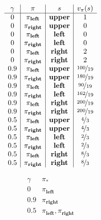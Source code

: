 \begin{solution}
\begin{align*}
    \begin{array}{c|c|c|c}
        \gamma & \pi                & s              & v_\pi(s)           \\ \hline
        0      & \pi_\textbf{left}  & \textbf{upper} & 1                  \\
        0      & \pi_\textbf{right} & \textbf{upper} & 0                  \\
        0      & \pi_\textbf{left}  & \textbf{left}  & 0                  \\
        0      & \pi_\textbf{right} & \textbf{left}  & 0                  \\
        0      & \pi_\textbf{left}  & \textbf{right} & 2                  \\
        0      & \pi_\textbf{right} & \textbf{right} & 2                  \\
        0.9    & \pi_\textbf{left}  & \textbf{upper} & \nicefrac{100}{19} \\
        0.9    & \pi_\textbf{right} & \textbf{upper} & \nicefrac{180}{19} \\
        0.9    & \pi_\textbf{left}  & \textbf{left}  & \nicefrac{90} {19} \\
        0.9    & \pi_\textbf{right} & \textbf{left}  & \nicefrac{162}{19} \\
        0.9    & \pi_\textbf{left}  & \textbf{right} & \nicefrac{200}{19} \\
        0.9    & \pi_\textbf{right} & \textbf{right} & \nicefrac{200}{19} \\
        0.5    & \pi_\textbf{left}  & \textbf{upper} & \nicefrac{4}{3}    \\
        0.5    & \pi_\textbf{right} & \textbf{upper} & \nicefrac{4}{3}    \\
        0.5    & \pi_\textbf{left}  & \textbf{left}  & \nicefrac{2}{3}    \\
        0.5    & \pi_\textbf{right} & \textbf{left}  & \nicefrac{2}{3}    \\
        0.5    & \pi_\textbf{left}  & \textbf{right} & \nicefrac{8}{3}    \\
        0.5    & \pi_\textbf{right} & \textbf{right} & \nicefrac{8}{3}    \\
    \end{array}
\end{align*}

\begin{align*}
    \begin{array}{c|c}
        \gamma & \pi_\ast                           \\ \hline
        0   & \pi_\textbf{left}                     \\
        0.9 & \pi_\textbf{right}                    \\
        0.5 & \pi_\textbf{left}, \pi_\textbf{right} \\
    \end{array}
\end{align*}

\end{solution}

